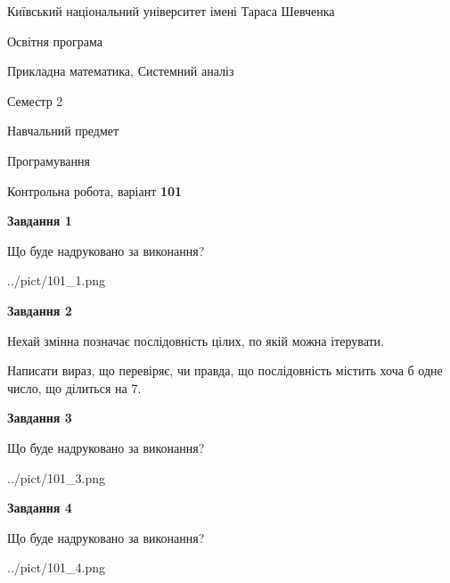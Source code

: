 \documentclass[12pt, ukrainian]{article}
\begin{document}
{{\begin {small}\par
{ \center  Київський національний університет імені Тараса Шевченка \par}
{\parbox {5 cm}{Освітня програма \hfill}{\parbox {8 cm}{Прикладна математика, Системний аналіз \hfill}}\parbox {5 cm}{\hfill Семестр 2}}\par
{\parbox {5 cm} {Навчальний предмет \hfill}\parbox {7 cm}{Програмування \hfill}\parbox {6cm}{\hfill}\par}\vspace{-7pt} \end{small}}{\center Контрольна робота, варіант  \No \textbf
{ 101 }\par}}
{
\begin {large}
{\begin {center}\textbf{Завдання 1}\end {center}}\par
Що буде надруковано за виконання?\par\par
\begin{center}
	{../pict/101_1.png}
\end{center}
\newpage

{\begin {center}\textbf{Завдання 2}\end {center}}\par
Нехай змінна  позначає послідовність цілих, по якій можна ітерувати.

Написати вираз, що перевіряє, чи правда, що послідовність  містить хоча б одне число, що ділиться на 7.\par
\newpage

{\begin {center}\textbf{Завдання 3}\end {center}}\par
Що буде надруковано за виконання?
\begin{center}
	{../pict/101_3.png}
\end{center}
\newpage

{\begin {center}\textbf{Завдання 4}\end {center}}\par
Що буде надруковано за виконання?\par
\begin{center}
	{../pict/101_4.png}
\end{center}
\newpage


\end{large}}
\end{document}
